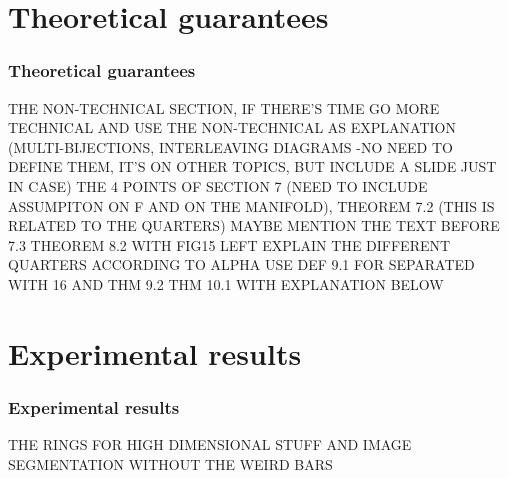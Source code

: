\documentclass{beamer}
\theoremstyle{definition}
\begin{document}
\section{Theoretical guarantees}
\begin{frame}
\frametitle{Theoretical guarantees}
THE NON-TECHNICAL SECTION, IF THERE'S TIME GO MORE TECHNICAL AND USE THE NON-TECHNICAL AS EXPLANATION (MULTI-BIJECTIONS, INTERLEAVING DIAGRAMS -NO NEED TO DEFINE THEM, IT'S ON OTHER TOPICS, BUT INCLUDE A SLIDE JUST IN CASE)
THE 4 POINTS OF SECTION 7 (NEED TO INCLUDE ASSUMPITON ON F AND ON THE MANIFOLD), THEOREM 7.2 (THIS IS RELATED TO THE QUARTERS) MAYBE MENTION THE TEXT BEFORE 7.3
THEOREM 8.2 WITH FIG15 LEFT
EXPLAIN THE DIFFERENT QUARTERS ACCORDING TO ALPHA
USE DEF 9.1 FOR SEPARATED WITH 16 AND THM 9.2
THM 10.1 WITH EXPLANATION BELOW
\end{frame}

\section{Experimental results}
\begin{frame}
\frametitle{Experimental results}
THE RINGS FOR HIGH DIMENSIONAL STUFF AND IMAGE SEGMENTATION WITHOUT THE WEIRD BARS
\end{frame}
\end{document}
